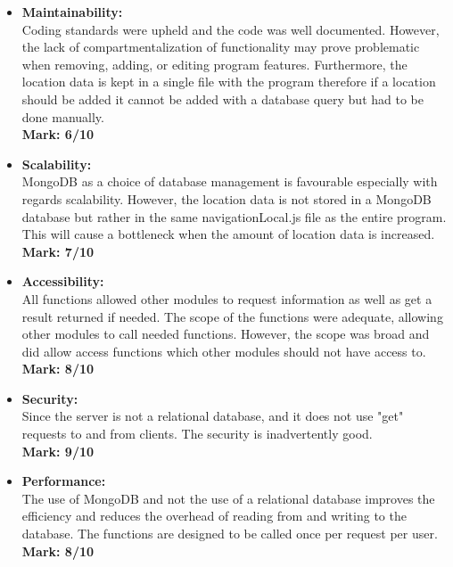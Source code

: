 \begin{itemize}
	
\item \textbf{Maintainability:}\\Coding standards were upheld and the code was well documented. However, the lack of compartmentalization of functionality may prove problematic when  removing, adding, or editing program features. Furthermore, the location data is kept in a single file with the program therefore if a location should be added it cannot be added with a database query but had to be done manually.\\
	\textbf{Mark: 6/10}
\item \textbf{Scalability:}\\MongoDB as a choice of database management is favourable especially with regards scalability. However, the location data is not stored in a MongoDB database but rather in the same navigationLocal.js file as the entire program. This will cause a bottleneck when the amount of location data is increased.\\
	\textbf{Mark: 7/10}
\item \textbf{Accessibility:}\\All functions allowed other modules to request information as well as get a result returned if needed. The scope of the functions were adequate, allowing other modules to call needed functions. However, the scope was broad and did allow access functions which other modules should not have access to.\\
	\textbf{Mark: 8/10}
\item \textbf{Security:}\\Since the server is not a relational database, and it does not use "get" requests to and from clients. The security is inadvertently good.\\
	\textbf{Mark: 9/10}
\item \textbf{Performance:}\\The use of MongoDB and not the use of a relational database improves the efficiency and reduces the overhead of reading from and writing to the database. The functions are designed to be called once per request per user. \\
	\textbf{Mark: 8/10}


\end{itemize}